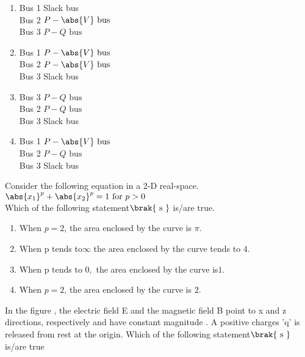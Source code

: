 \begin{enumerate}
    \item Bus 1  Slack bus\\ Bus 2  $P-\abs{V}\text{ bus }$\\Bus 3  $P-Q \text{ bus }$
    \item Bus 1  $P-\abs{V}\text{ bus }$\\Bus 2  $P-\abs{V}\text{ bus }$\\Bus 3  Slack bus
    \item Bus 3  $P-Q \text{ bus }$\\Bus 2  $P-Q \text{ bus }$\\Bus 3  Slack bus
    \item Bus 1  $P-\abs{V}\text{ bus }$\\Bus 2  $P-Q \text{ bus }$\\Bus 3  Slack bus
\end{enumerate}
\bigskip
\item Consider the following equation in a 2-D real-space.\\
$\abs{x_{1}}^{p}+\abs{x_{2}}^{p}=1\text{ for } p>0$\\
Which of the following statement$\brak{\text{ s }}$ is/are true.
\begin{enumerate}
    \item When $p = 2$, the area enclosed by the curve is $\pi.$
    \item When p tends to$\infty$ the area enclosed by the curve tends to $4$.
    \item When p tends to $0,$ the area enclosed by the curve is$ 1.$
    \item When $p = 2$, the area enclosed by the curve is $2.$
\end{enumerate}
\bigskip
\item In the figure , the electric field E and the magnetic field B point to x and z directions, respectively  and have constant magnitude . A positive charges 'q' is released  from  rest at the origin. Which of the following statement$\brak{\text{ s }}$ is/are true
\begin{figure}[!ht]
\centering
{}%

\end{figure}

